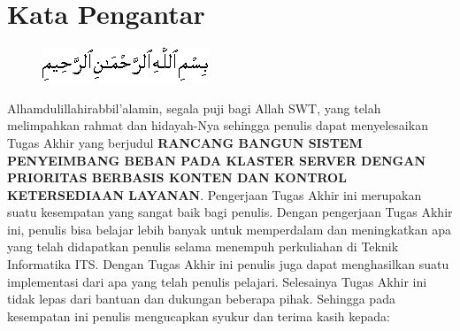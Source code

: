 \documentclass{ta-its}
\begin{document}
    \chapter{Kata Pengantar}
	    \begin{figure}[h]
	    	\centering
	    	\includegraphics[width=0.5\linewidth]{contoh_img/gambarBismillah}
	    \end{figure}

        Alhamdulillahirabbil’alamin, segala puji bagi Allah SWT, yang telah melimpahkan rahmat dan hidayah-Nya sehingga penulis dapat menyelesaikan Tugas Akhir yang berjudul \textbf{RANCANG BANGUN SISTEM PENYEIMBANG BEBAN PADA KLASTER SERVER DENGAN PRIORITAS BERBASIS KONTEN DAN KONTROL KETERSEDIAAN LAYANAN}. Pengerjaan Tugas Akhir ini merupakan suatu kesempatan yang sangat baik bagi penulis. Dengan pengerjaan Tugas Akhir ini, penulis bisa belajar lebih banyak untuk memperdalam dan meningkatkan apa yang telah didapatkan penulis selama menempuh perkuliahan di Teknik Informatika ITS. Dengan Tugas Akhir ini penulis juga dapat menghasilkan suatu implementasi dari apa yang telah penulis pelajari.
        Selesainya Tugas Akhir ini tidak lepas dari bantuan dan dukungan beberapa pihak. Sehingga pada kesempatan ini penulis mengucapkan syukur dan terima kasih kepada:
\end{document}
